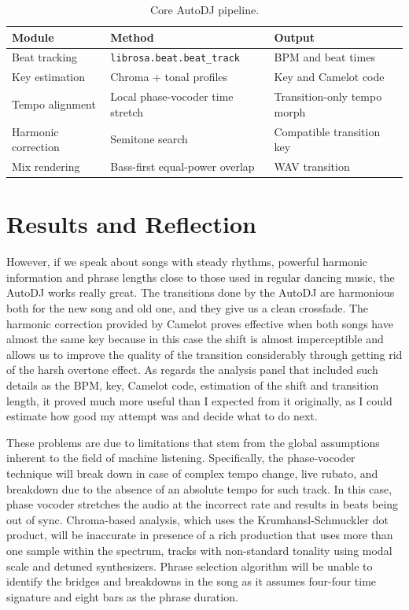 \documentclass[11pt]{article}
\begin{document}
    \begin{table}[h]
        \centering
        \begin{tabular}{lll}
            \toprule
            Module & Method & Output \\
            \midrule
            Beat tracking & \texttt{librosa.beat.beat\_track} & BPM and beat times \\
            Key estimation & Chroma + tonal profiles & Key and Camelot code \\
            Tempo alignment & Local phase-vocoder time stretch & Transition-only tempo morph \\
            Harmonic correction & Semitone search & Compatible transition key \\
            Mix rendering & Bass-first equal-power overlap & WAV transition \\
            \bottomrule
        \end{tabular}
        \caption{Core AutoDJ pipeline.}
    \end{table}

    \section{Results and Reflection}
    However, if we speak about songs with steady rhythms, powerful harmonic information and phrase lengths close to those used in regular dancing music, the AutoDJ works really great. The transitions done by the AutoDJ are harmonious both for the new song and old one, and they give us a clean crossfade. The harmonic correction provided by Camelot proves effective when both songs have almost the same key because in this case the shift is almost imperceptible and allows us to improve the quality of the transition considerably through getting rid of the harsh overtone effect. As regards the analysis panel that included such details as the BPM, key, Camelot code, estimation of the shift and transition length, it proved much more useful than I expected from it originally, as I could estimate how good my attempt was and decide what to do next.

    These problems are due to limitations that stem from the global assumptions inherent to the field of machine listening. Specifically, the phase-vocoder technique will break down in case of complex tempo change, live rubato, and breakdown due to the absence of an absolute tempo for such track. In this case, phase vocoder stretches the audio at the incorrect rate and results in beats being out of sync. Chroma-based analysis, which uses the Krumhansl-Schmuckler dot product, will be inaccurate in presence of a rich production that uses more than one sample within the spectrum, tracks with non-standard tonality using modal scale and detuned synthesizers. Phrase selection algorithm will be unable to identify the bridges and breakdowns in the song as it assumes four-four time signature and eight bars as the phrase duration.
\end{document}
